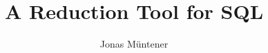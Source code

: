 \documentclass[]{article}
\title{A Reduction Tool for SQL}
\author{Jonas Müntener}
\begin{document}
\maketitle

\begin{abstract}

\end{abstract}






\end{document}
